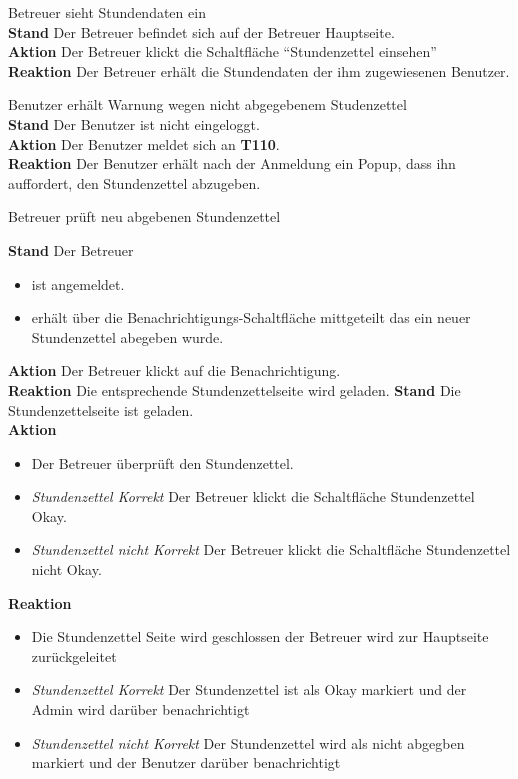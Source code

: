 \begin{requirements}
	 Betreuer sieht Stundendaten ein \\
	        \textbf{Stand} Der Betreuer befindet sich auf der Betreuer Hauptseite. \\
            \textbf{Aktion} Der Betreuer klickt die Schaltfläche "`Stundenzettel einsehen"' \\
            \textbf{Reaktion} Der Betreuer erhält die Stundendaten der ihm zugewiesenen Benutzer.


	 Benutzer erhält Warnung wegen nicht abgegebenem Studenzettel \\
        \textbf{Stand} Der Benutzer ist nicht eingeloggt. \\
        \textbf{Aktion} Der Benutzer meldet sich an \textbf{T110}. \\
        \textbf{Reaktion} Der Benutzer erhält nach der Anmeldung ein Popup, dass ihn auffordert, den Stundenzettel abzugeben.

	 Betreuer prüft neu abgebenen Stundenzettel
	\begin{requirements}
	        \textbf{Stand} Der Betreuer
	            \begin{itemize}
	                \item ist angemeldet.
	                \item erhält über die Benachrichtigungs-Schaltfläche mittgeteilt das ein neuer Stundenzettel abegeben wurde.
	            \end{itemize}
            \textbf{Aktion} Der Betreuer klickt auf die Benachrichtigung. \\
            \textbf{Reaktion} Die entsprechende Stundenzettelseite wird  geladen.
	        \textbf{Stand} Die Stundenzettelseite ist geladen. \\
            \textbf{Aktion}
                \begin{itemize}
                    \item Der Betreuer überprüft den Stundenzettel.
                    \item \textit{Stundenzettel Korrekt} Der Betreuer klickt die Schaltfläche Stundenzettel Okay.
                    \item \textit{Stundenzettel nicht Korrekt}  Der Betreuer klickt die Schaltfläche Stundenzettel nicht Okay.
                \end{itemize}
            \textbf{Reaktion}
                \begin{itemize}
                    \item Die Stundenzettel Seite wird geschlossen der Betreuer wird zur Hauptseite zurückgeleitet
                    \item \textit{Stundenzettel Korrekt} Der Stundenzettel ist als Okay markiert und der Admin wird darüber benachrichtigt
                    \item \textit{Stundenzettel nicht Korrekt} Der Stundenzettel wird als nicht abgegben markiert und der Benutzer darüber benachrichtigt
                \end{itemize}
	\end{requirements}


\end{requirements}
